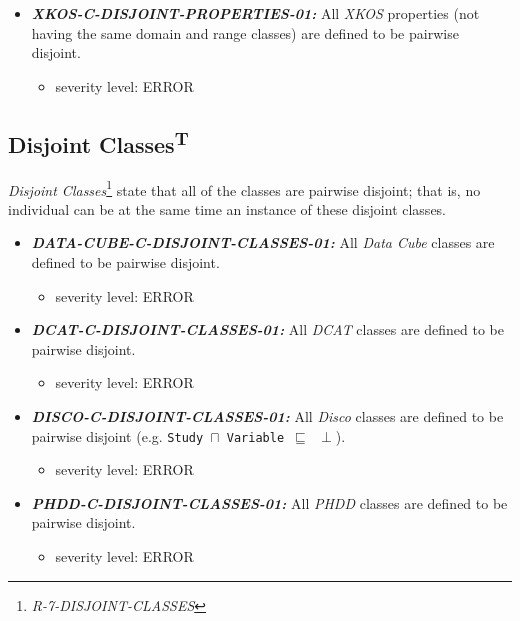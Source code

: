\documentclass{llncs}
\newcommand{\ms}[1]{\texttt{#1}}
\begin{document}
\begin{itemize}
	\item \textbf{{\em XKOS-C-DISJOINT-PROPERTIES-01:}} 
	All \emph{XKOS} properties (not having the same domain and range classes) are defined to be pairwise disjoint.
	\begin{itemize}
		\item severity level: ERROR
	\end{itemize}
\end{itemize}

\subsection{Disjoint Classes\textsuperscript{T}}

{\em Disjoint Classes}\footnote{{\em R-7-DISJOINT-CLASSES}} state that all of the classes are pairwise disjoint; 
that is, no individual can be at the same time an instance of these disjoint classes.

\begin{itemize}
	\item \textbf{{\em DATA-CUBE-C-DISJOINT-CLASSES-01:}} 
All \emph{Data Cube} classes are defined to be pairwise disjoint.
\begin{itemize}
		\item severity level: ERROR
	\end{itemize}
\end{itemize}

\begin{itemize}
	\item \textbf{{\em DCAT-C-DISJOINT-CLASSES-01:}} 
All \emph{DCAT} classes are defined to be pairwise disjoint.
\begin{itemize}
		\item severity level: ERROR
	\end{itemize}
\end{itemize}

\begin{itemize}
	\item \textbf{{\em DISCO-C-DISJOINT-CLASSES-01:}} 
All \emph{Disco} classes are defined to be pairwise disjoint (e.g. \ms{Study $\sqcap$ Variable $\sqsubseteq$ $\perp$}).
\begin{itemize}
		\item severity level: ERROR
	\end{itemize}
\end{itemize}

\begin{itemize}
	\item \textbf{{\em PHDD-C-DISJOINT-CLASSES-01:}} 
All \emph{PHDD} classes are defined to be pairwise disjoint.
\begin{itemize}
		\item severity level: ERROR
	\end{itemize}
\end{itemize}
\end{document}
